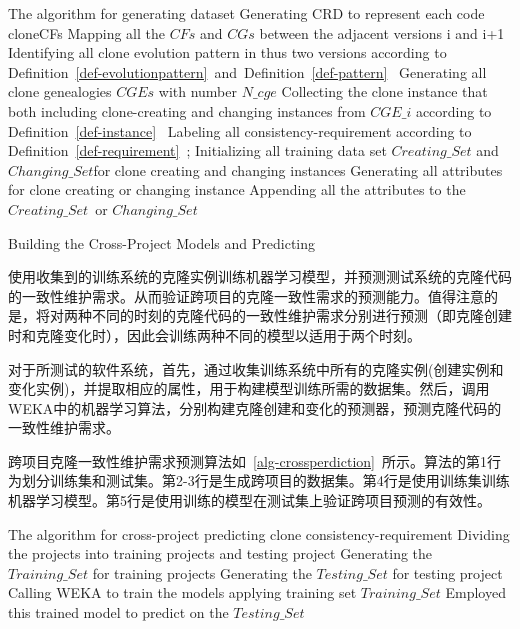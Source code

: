 \begin{minipage}{0.8\textwidth}
\centering
\begin{algorithm}[H]
 {The algorithm for generating dataset}
\label{alg-collection}
{ 
 Generating CRD to represent each code clone{CFs}\;
 Mapping all the $CFs$ and $CGs$ between the adjacent versions {i} and {i+1}\;
 Identifying all clone evolution pattern in thus two versions according to Definition~\ref{def-evolutionpattern}~and~Definition~\ref{def-pattern}~\;
}
Generating all clone genealogies $CGEs$ with number $N\_cge$\;
{ 
 Collecting the clone instance that both including clone-creating and changing instances from $CGE\_i$ according to Definition~\ref{def-instance}~\; 
 Labeling all consistency-requirement according to Definition~\ref{def-requirement}~;
}
Initializing all training data set $Creating\_Set$ and $Changing\_Set$for clone creating and changing instances\; 
{ 
Generating all attributes for clone creating or changing instance\;
Appending all the attributes to the $Creating\_Set$\ or $Changing\_Set$\;
}
\end{algorithm}
\end{minipage}

{Building the Cross-Project Models and Predicting}

使用收集到的训练系统的克隆实例训练机器学习模型，并预测测试系统的克隆代码的一致性维护需求。从而验证跨项目的克隆一致性需求的预测能力。值得注意的是，将对两种不同的时刻的克隆代码的一致性维护需求分别进行预测（即克隆创建时和克隆变化时），因此会训练两种不同的模型以适用于两个时刻。

对于所测试的软件系统，首先，通过收集训练系统中所有的克隆实例(创建实例和变化实例)，并提取相应的属性，用于构建模型训练所需的数据集。然后，调用WEKA中的机器学习算法，分别构建克隆创建和变化的预测器，预测克隆代码的一致性维护需求。

跨项目克隆一致性维护需求预测算法如~\ref{alg-crossperdiction}~所示。算法的第1行为划分训练集和测试集。第2-3行是生成跨项目的数据集。第4行是使用训练集训练机器学习模型。第5行是使用训练的模型在测试集上验证跨项目预测的有效性。

\begin{minipage}{0.8\textwidth}
\centering
\begin{algorithm}[H]
 {The algorithm for cross-project predicting clone consistency-requirement}
\label{alg-crossperdiction}
Dividing the projects into training projects and testing project\;
Generating the $Training\_{Set}$ for training projects\;
Generating the $Testing\_{Set}$ for testing project\;
Calling WEKA to train the models applying training set $Training\_{Set}$\;
Employed this trained model to predict on the $Testing\_{Set}$\;
\end{algorithm}
\end{minipage}

